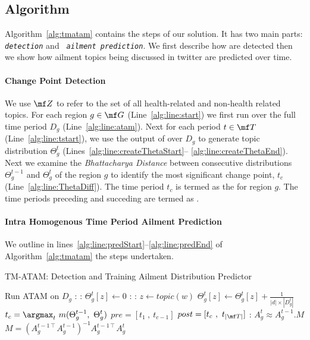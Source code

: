 \subsection{Algorithm}
\label{subsec:tmalg}
Algorithm~\ref{alg:tmatam} contains the steps of our solution. It has 
two main parts:  \change \emph{\texttt{detection}} and \emph{\texttt{ ailment prediction}}. 
We first describe how \changes are detected then we show how ailment topics being discussed in twitter 
are predicted over time.
\paragraph{Change Point Detection}
We use $\mf Z$ to refer to the set of all health-related and non-health 
related topics. For each region $g \in \mf G$ (Line~\ref{alg:line:start}) 
we first run \atam over the full time period $D_g$ (Line~\ref{alg:line:atam}).
Next for each period $t\in \mf T$ (Line~\ref{alg:line:tstart}), 
we use the output of \atam over $D_g$ to generate 
topic distribution $\Theta_g^t$ (Lines~\ref{alg:line:createThetaStart}--
\ref{alg:line:createThetaEnd}).
Next we examine the  \emph{Bhattacharya Distance} between consecutive distributions
$\Theta_g^{t-1}$ and $\Theta_g^t$ of the region $g$ 
to identify the most significant change point, $t_c$ (Line~\ref{alg:line:ThetaDiff}).
The time period $t_c$ is termed as the \change for
region $g$. The time periods preceding and succeding \change are termed as \seasons.
\paragraph{Intra Homogenous Time Period Ailment Prediction}
We outline in lines~\ref{alg:line:predStart}--\ref{alg:line:predEnd} 
of Algorithm~\ref{alg:tmatam} the steps undertaken. 
\begin{algorithm}[t]
\caption{TM-ATAM: \change Detection and Training Ailment Distribution Predictor}
\label{alg:tmatam}
\begin{algorithmic}[1]
 \label{alg:line:start}
 \State Run ATAM on $D_g$\label{alg:line:atam}
 :\label{alg:line:tstart}
 :\label{alg:line:createThetaStart}
 \State $\Theta_g^t[z] \leftarrow 0$
 \EndFor
 :
 :
 \State $z \gets topic(w)$
 \State $\Theta_g^t[z] \gets \Theta_g^t[z] + \frac{1}{|d|\times |D_g^t|}$
 \EndFor
 \EndFor\label{alg:line:createThetaEnd}
 \EndFor
 \State $\displaystyle t_{c} = \argmax_t{\ m(\Theta_g^{t-1},\ \Theta_g^{t})}$\label{alg:line:ThetaDiff}
 \State $pre = [t_1\ ,\ t_{c-1}]$\label{alg:line:buildSeasonPre} 
 \State $post = [t_{c}\ , \ t_{|\mf T|}]$\label{alg:line:buildSeasonPost} 
 :\label{alg:line:predStart}
 \State $A_g^t\approx A_g^{t-1}.M$
 \State $M =(A_g^{t-1\intercal}A_g^{t-1})^{-1}A_g^{t-1\intercal}A_g^t$
 \EndFor\label{alg:line:predEnd}
\EndFor\label{alg:line:end}
\end{algorithmic}
\end{algorithm}
